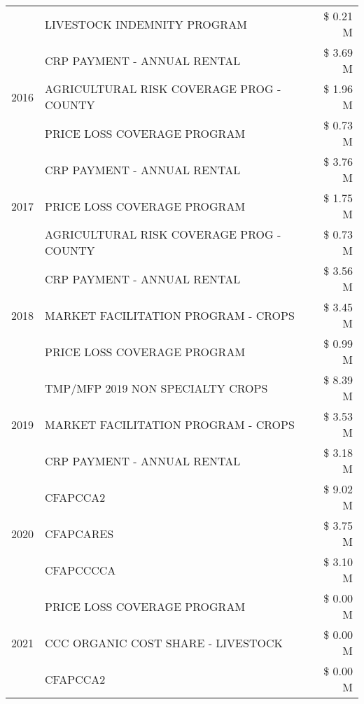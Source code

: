 \begin{tabular}{llr}
 & LIVESTOCK INDEMNITY PROGRAM & \$ 0.21 M \\
\cline{1-3}
\multirow[t]{3}{*}{2016} & CRP PAYMENT - ANNUAL RENTAL & \$ 3.69 M \\
 & AGRICULTURAL RISK COVERAGE PROG - COUNTY & \$ 1.96 M \\
 & PRICE LOSS COVERAGE PROGRAM & \$ 0.73 M \\
\cline{1-3}
\multirow[t]{3}{*}{2017} & CRP PAYMENT - ANNUAL RENTAL & \$ 3.76 M \\
 & PRICE LOSS COVERAGE PROGRAM & \$ 1.75 M \\
 & AGRICULTURAL RISK COVERAGE PROG - COUNTY & \$ 0.73 M \\
\cline{1-3}
\multirow[t]{3}{*}{2018} & CRP PAYMENT - ANNUAL RENTAL & \$ 3.56 M \\
 & MARKET FACILITATION PROGRAM - CROPS & \$ 3.45 M \\
 & PRICE LOSS COVERAGE PROGRAM & \$ 0.99 M \\
\cline{1-3}
\multirow[t]{3}{*}{2019} & TMP/MFP 2019 NON SPECIALTY CROPS & \$ 8.39 M \\
 & MARKET FACILITATION PROGRAM - CROPS & \$ 3.53 M \\
 & CRP PAYMENT - ANNUAL RENTAL & \$ 3.18 M \\
\cline{1-3}
\multirow[t]{3}{*}{2020} & CFAPCCA2 & \$ 9.02 M \\
 & CFAPCARES & \$ 3.75 M \\
 & CFAPCCCCA & \$ 3.10 M \\
\cline{1-3}
\multirow[t]{3}{*}{2021} & PRICE LOSS COVERAGE PROGRAM & \$ 0.00 M \\
 & CCC ORGANIC COST SHARE - LIVESTOCK & \$ 0.00 M \\
 & CFAPCCA2 & \$ 0.00 M \\
\cline{1-3}
\bottomrule
\end{tabular}
